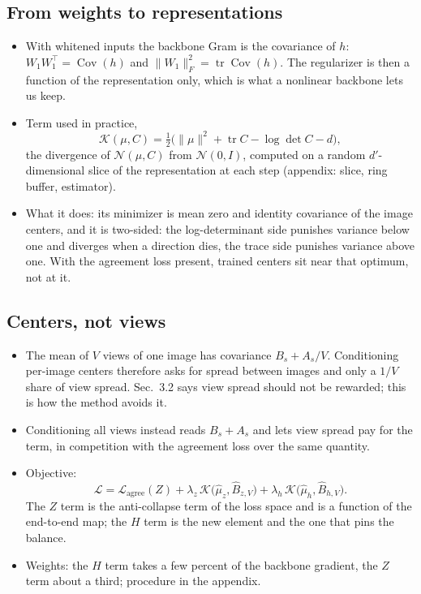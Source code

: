 \documentclass[11pt]{article}
\numberwithin{equation}{section}
\theoremstyle{definition}
\theoremstyle{remark}
\newcommand{\Cov}{\operatorname{Cov}}
\newcommand{\tr}{\operatorname{tr}}
\newcommand{\cL}{\mathcal{L}}
\newcommand{\cK}{\mathcal{K}}
\newcommand{\norm}[1]{\lVert #1\rVert}
\begin{document}
\subsection{From weights to representations}
\begin{itemize}
    \item With whitened inputs the backbone Gram is the covariance of \(h\):
    \(W_1 W_1^\top = \Cov(h)\) and \(\norm{W_1}_F^2 = \tr \Cov(h)\). The regularizer is
    then a function of the representation only, which is what a nonlinear backbone lets
    us keep.

    \item Term used in practice,
    \[
        \cK(\mu, C)
        =
        \tfrac12\big(\norm{\mu}^2 + \tr C - \log\det C - d\big),
    \]
    the divergence of \(\mathcal N(\mu, C)\) from \(\mathcal N(0, I)\), computed on a
    random \(d'\)-dimensional slice of the representation at each step (appendix: slice,
    ring buffer, estimator).

    \item What it does: its minimizer is mean zero and identity covariance of the image
    centers, and it is two-sided: the log-determinant side punishes variance below one
    and diverges when a direction dies, the trace side punishes variance above one. With
    the agreement loss present, trained centers sit near that optimum, not at it.
\end{itemize}

\subsection{Centers, not views}
\begin{itemize}
    \item The mean of \(V\) views of one image has covariance \(B_s + A_s / V\).
    Conditioning per-image centers therefore asks for spread between images and only a
    \(1/V\) share of view spread. Sec.~3.2 says view spread should not be rewarded; this
    is how the method avoids it.

    \item Conditioning all views instead reads \(B_s + A_s\) and lets view spread pay for
    the term, in competition with the agreement loss over the same quantity.

    \item Objective:
    \[
        \cL
        =
        \cL_{\mathrm{agree}}(Z)
        + \lambda_z\, \cK\big(\hat\mu_z, \hat B_{z,V}\big)
        + \lambda_h\, \cK\big(\hat\mu_h, \hat B_{h,V}\big).
    \]
    The \(Z\) term is the anti-collapse term of the loss space and is a function of the
    end-to-end map; the \(H\) term is the new element and the one that pins the balance.

    \item Weights: the \(H\) term takes a few percent of the backbone gradient, the \(Z\)
    term about a third; procedure in the appendix.
\end{itemize}
\end{document}
